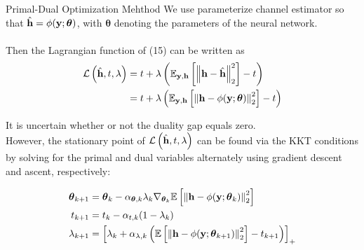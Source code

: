 \documentclass[hyperref={bookmarks=false}]{beamer}
\numberwithin{figure}{section}
\begin{document}
\begin{frame}[allowframebreaks]{Primal-Dual Optimization Mehthod}
We use parameterize channel estimator so that $\hat{{\bf h}}=\phi(\mathbf{y};\boldsymbol{\theta})$, 
with $\boldsymbol{\theta}$ denoting the parameters of the neural network.
\\ \hspace*{\fill} \\
Then the Lagrangian function of (15) can be written as
\begin{equation*}
    \begin{split}
        \mathcal{L} \left(\hat{{\bf h}},t,\lambda\right)
        &= t + \lambda\left(\mathbb{E}_{{\bf y},{\bf h}}\left[\left\| {\bf h}-\hat{{\bf h}} \right\|^2_2 \right] -t \right)\\
        &= t + \lambda\left(\mathbb{E}_{{\bf y},{\bf h}}\left[\left\| {\bf h}-\phi(\mathbf{y};\boldsymbol{\theta}) \right\|^2_2 \right] -t \right)
    \end{split}
\end{equation*}
\framebreak

It is uncertain whether or not the duality gap equals zero.\\
However, the stationary point of $  \mathcal{L} \left(\hat{{\bf h}},t,\lambda\right)$
can be found via the KKT conditions by solving for the primal and dual
variables alternately using gradient descent and ascent, respectively:

\begin{equation*}
    \begin{split}
        \boldsymbol{\theta}_{k+1} &= \boldsymbol{\theta}_{k} - 
            \alpha_{\boldsymbol{\theta},k} \lambda_k \nabla_{\boldsymbol{\theta}_k}
            \mathbb{E}\left[\left\| {\bf h}-\phi(\mathbf{y};\boldsymbol{\theta}_k) \right\|^2_2 \right]\\
        t_{k+1} &= t_{k} - \alpha_{t,k}(1-\lambda_k)\\
        \lambda_{k+1} &= \left[ \lambda_k + \alpha_{\lambda,k}
            \left( \mathbb{E}\left[\left\| {\bf h}-\phi(\mathbf{y};\boldsymbol{\theta}_{k+1}) \right\|^2_2 \right] 
            -t_{k+1}\right)\right]_{+}
    \end{split}
\end{equation*}

\end{frame}
\end{document}
